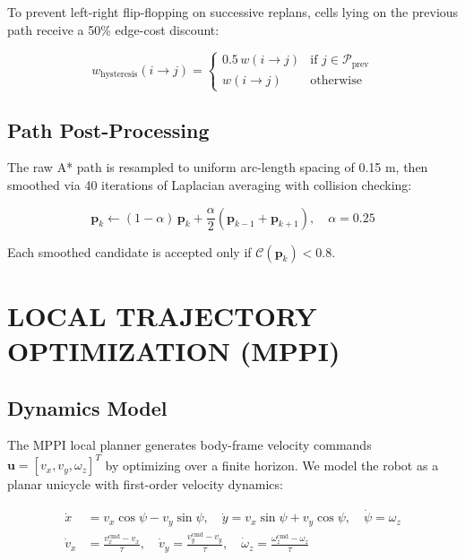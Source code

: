 \documentclass[11pt,a4paper]{article}
\begin{document}
To prevent left-right flip-flopping on successive replans, cells lying on the previous path receive a 50\% edge-cost discount:

\begin{equation}
w_{\text{hysteresis}}(i \to j) = \begin{cases} 0.5\, w(i \to j) & \text{if } j \in \mathcal{P}_{\text{prev}} \\ w(i \to j) & \text{otherwise} \end{cases}
\end{equation}

\subsection{Path Post-Processing}

The raw A* path is resampled to uniform arc-length spacing of 0.15 m, then smoothed via 40 iterations of Laplacian averaging with collision checking:

\begin{equation}
\mathbf{p}_k \leftarrow (1 - \alpha)\,\mathbf{p}_k + \frac{\alpha}{2}(\mathbf{p}_{k-1} + \mathbf{p}_{k+1}), \quad \alpha = 0.25
\end{equation}

Each smoothed candidate is accepted only if $\mathcal{C}(\mathbf{p}_k) < 0.8$.

\section{LOCAL TRAJECTORY OPTIMIZATION (MPPI)}

\subsection{Dynamics Model}

The MPPI local planner generates body-frame velocity commands $\mathbf{u} = [v_x, v_y, \omega_z]^T$ by optimizing over a finite horizon. We model the robot as a planar unicycle with first-order velocity dynamics:

\begin{align}
\dot{x} &= v_x \cos\psi - v_y \sin\psi, \quad \dot{y} = v_x \sin\psi + v_y \cos\psi, \quad \dot{\psi} = \omega_z \\
\dot{v}_x &= \frac{v_x^{\text{cmd}} - v_x}{\tau}, \quad \dot{v}_y = \frac{v_y^{\text{cmd}} - v_y}{\tau}, \quad \dot{\omega}_z = \frac{\omega_z^{\text{cmd}} - \omega_z}{\tau}
\end{align}
\end{document}
